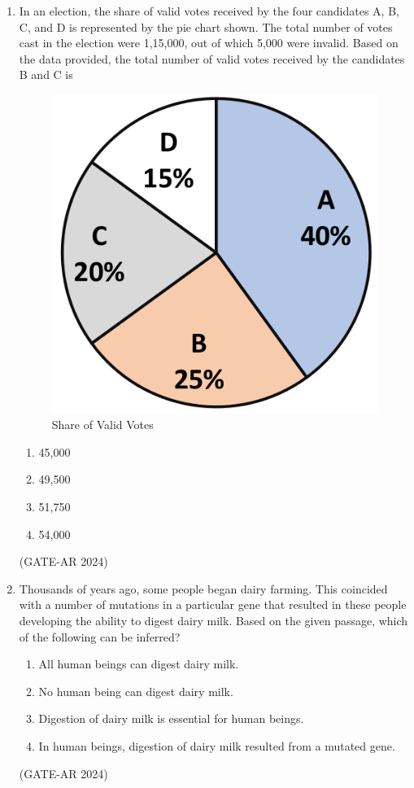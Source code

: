 \documentclass[a4paper,10pt]{article}
\begin{document}
\begin{enumerate}
    \item In an election, the share of valid votes received by the four candidates A, B, C, and D is represented by the pie chart shown. The total number of votes cast in the election were 1,15,000, out of which 5,000 were invalid. Based on the data provided, the total number of valid votes received by the candidates B and C is
    \begin{figure}[h!]
    \centering
    \includegraphics[width=0.5\columnwidth]{figs/02.jpg}
    \caption{Share of Valid Votes}
    \label{fig:Img02}
    \end{figure}
    \begin{multicols}{4}
    \begin{enumerate}
        \item 45,000
        \item 49,500
        \item 51,750
        \item 54,000
    \end{enumerate}
    \end{multicols}
    \hfill (GATE-AR 2024)

    \item Thousands of years ago, some people began dairy farming. This coincided with a number of mutations in a particular gene that resulted in these people developing the ability to digest dairy milk. Based on the given passage, which of the following can be inferred?
    \begin{enumerate}
        \item All human beings can digest dairy milk.
        \item No human being can digest dairy milk.
        \item Digestion of dairy milk is essential for human beings.
        \item In human beings, digestion of dairy milk resulted from a mutated gene.
    \end{enumerate}
    \hfill (GATE-AR 2024)


\end{enumerate}
\end{document}
